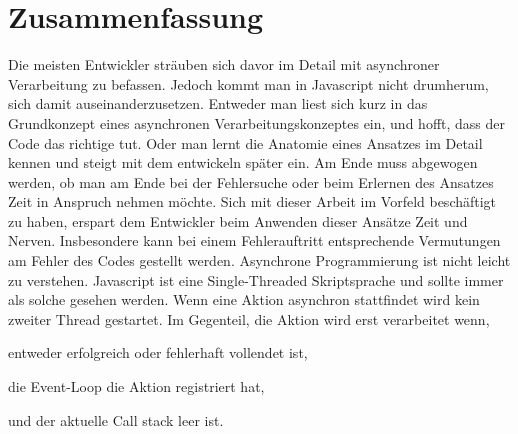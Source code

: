 \section{Zusammenfassung}
Die meisten Entwickler sträuben sich davor im Detail mit asynchroner Verarbeitung zu befassen. Jedoch kommt man in Javascript nicht drumherum, sich damit auseinanderzusetzen. Entweder man liest sich kurz in das Grundkonzept eines asynchronen Verarbeitungskonzeptes ein, und hofft, dass der Code das \glqq richtige tut\grqq{}. Oder man lernt die Anatomie eines Ansatzes im Detail kennen und steigt mit dem entwickeln später ein. Am Ende muss abgewogen werden, ob man am Ende bei der Fehlersuche oder beim Erlernen des Ansatzes Zeit in Anspruch nehmen möchte. Sich mit dieser Arbeit im Vorfeld beschäftigt zu haben, erspart dem Entwickler beim Anwenden dieser Ansätze Zeit und Nerven. Insbesondere kann bei einem Fehlerauftritt entsprechende Vermutungen am Fehler des Codes gestellt werden. Asynchrone Programmierung ist nicht leicht zu verstehen. Javascript ist eine Single-Threaded Skriptsprache und sollte immer als solche gesehen werden. Wenn eine Aktion asynchron stattfindet wird kein zweiter Thread gestartet. Im Gegenteil, die Aktion wird erst verarbeitet wenn, 

\begin{description}
\item entweder erfolgreich oder fehlerhaft vollendet ist,
\item die Event-Loop die Aktion registriert hat,
\item und der aktuelle Call stack leer ist.
\end{description}

